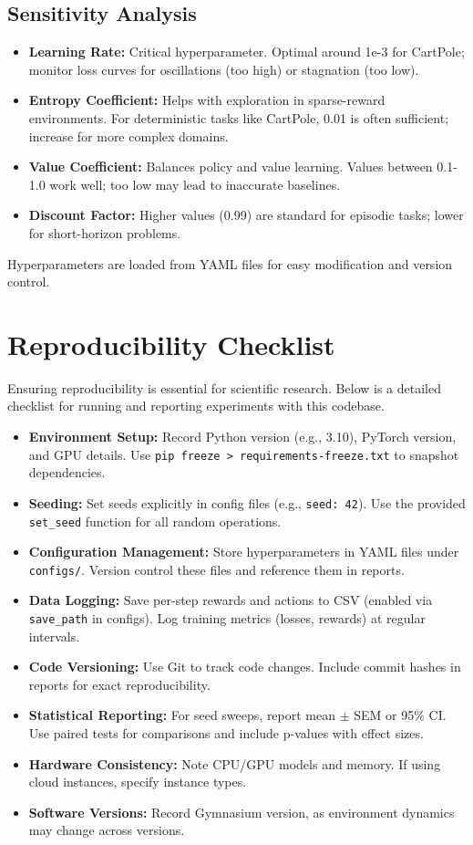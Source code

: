 \documentclass[11pt]{article}
\begin{document}
\subsection{Sensitivity Analysis}
\begin{itemize}
  \item \textbf{Learning Rate:} Critical hyperparameter. Optimal around 1e-3 for CartPole; monitor loss curves for oscillations (too high) or stagnation (too low).
  \item \textbf{Entropy Coefficient:} Helps with exploration in sparse-reward environments. For deterministic tasks like CartPole, 0.01 is often sufficient; increase for more complex domains.
  \item \textbf{Value Coefficient:} Balances policy and value learning. Values between 0.1-1.0 work well; too low may lead to inaccurate baselines.
  \item \textbf{Discount Factor:} Higher values (0.99) are standard for episodic tasks; lower for short-horizon problems.
\end{itemize}

Hyperparameters are loaded from YAML files for easy modification and version control.
\section{Reproducibility Checklist}
Ensuring reproducibility is essential for scientific research. Below is a detailed checklist for running and reporting experiments with this codebase.

\begin{itemize}
  \item \textbf{Environment Setup:} Record Python version (e.g., 3.10), PyTorch version, and GPU details. Use \texttt{pip freeze > requirements-freeze.txt} to snapshot dependencies.
  \item \textbf{Seeding:} Set seeds explicitly in config files (e.g., \texttt{seed: 42}). Use the provided \texttt{set\_seed} function for all random operations.
  \item \textbf{Configuration Management:} Store hyperparameters in YAML files under \texttt{configs/}. Version control these files and reference them in reports.
  \item \textbf{Data Logging:} Save per-step rewards and actions to CSV (enabled via \texttt{save\_path} in configs). Log training metrics (losses, rewards) at regular intervals.
  \item \textbf{Code Versioning:} Use Git to track code changes. Include commit hashes in reports for exact reproducibility.
  \item \textbf{Statistical Reporting:} For seed sweeps, report mean $\pm$ SEM or 95\% CI. Use paired tests for comparisons and include p-values with effect sizes.
  \item \textbf{Hardware Consistency:} Note CPU/GPU models and memory. If using cloud instances, specify instance types.
  \item \textbf{Software Versions:} Record Gymnasium version, as environment dynamics may change across versions.
\end{itemize}
\end{document}
